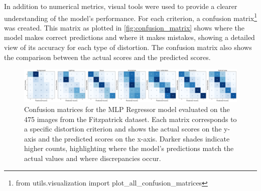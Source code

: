 \vspace{\baselineskip}
\noindent
In addition to numerical metrics, visual tools were used to provide a clearer understanding of the model's performance. For each criterion, a confusion matrix\footnote{from utils.visualization import plot\_all\_confusion\_matrices} was created. This matrix as plotted in \autoref{fig:confusion_matrix} shows where the model makes correct predictions and where it makes mistakes, showing a detailed view of its accuracy for each type of distortion. The confusion matrix also shows the comparison between the actual scores and the predicted scores.
\begin{figure}[ht]
    \centering
    \includegraphics[keepaspectratio,width=15cm]{img/Confusion_matrix.png}
    \caption{Confusion matrices for the MLP Regressor model evaluated on the 475 images from the Fitzpatrick dataset. Each matrix corresponds to a specific distortion criterion and shows the actual scores on the y-axis and the predicted scores on the x-axis. Darker shades indicate higher counts, highlighting where the model's predictions match the actual values and where discrepancies occur.}
    \label{fig:confusion_matrix}
\end{figure}

